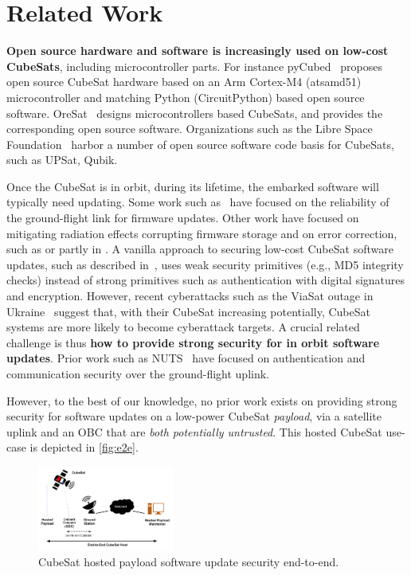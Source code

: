 \section{Related Work}
\label{sec:background-related-work}

{\bf Open source hardware and software is increasingly used on low-cost CubeSats}, including microcontroller parts.
For instance pyCubed~\cite{Holliday2019PyCubed} proposes open source CubeSat hardware based on an Arm Cortex-M4 (atsamd51)
microcontroller and matching Python (CircuitPython) based open source software. OreSat~\cite{spivey2021oresat} designs
microcontrollers based CubeSats, and provides the corresponding open source software. Organizations such as the Libre
Space Foundation~\cite{librespace} harbor a number of open source software code basis for CubeSats, such as UPSat, Qubik.

Once the CubeSat is in orbit, during its lifetime, the embarked software will typically need updating.
Some work such as~\cite{FitzsimmonsReliableSoftwareUpdates} have focused on the reliability of the ground-flight link for firmware updates.
Other work have focused on mitigating radiation effects corrupting firmware storage and on error correction, such as \cite{yuen2019low}
or partly in \cite{sunter2016updatesnano}.
A vanilla approach to securing low-cost CubeSat software updates, such as described in~\cite{maison2021otaeducubesat},
uses weak security primitives (e.g., MD5 integrity checks) instead of strong primitives such as authentication
with digital signatures and encryption.
However, recent cyberattacks such as the ViaSat outage in Ukraine~\cite{viasat-cyberattack} suggest that, with their CubeSat
increasing potentially, CubeSat systems are more likely to become cyberattack targets.
A crucial related challenge is thus {\bf how to provide strong security for in orbit software updates}.
Prior work such as NUTS~\cite{bezem2013nutsAuthenticatedUplink} have focused on authentication
and communication security over the ground-flight uplink.

However, to the best of our knowledge, no prior work exists on providing strong security for software updates on a low-power
CubeSat \textit{payload}, via a satellite uplink and an OBC that are \textit{both potentially untrusted}.
This hosted CubeSat use-case is depicted in \autoref{fig:e2e}.

\begin{figure}[t]
    \centering
    \includegraphics[width=0.4\textwidth]{Figures/CubeSat-Payload-End2End.png}
    \caption{CubeSat hosted payload software update security end-to-end.}
    \label{fig:e2e}
\end{figure}

